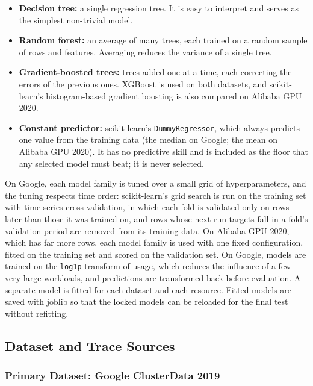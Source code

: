 \documentclass{IEEEtran}
\providecommand{\tightlist}{\setlength{\itemsep}{0pt}\setlength{\parskip}{0pt}}
\begin{document}
\begin{itemize}
\tightlist
\item
  \textbf{Decision tree:} a single regression tree. It is easy to interpret and serves as the simplest non-trivial model.
\item
  \textbf{Random forest:} an average of many trees, each trained on a random sample of rows and features. Averaging reduces the variance of a single tree.
\item
  \textbf{Gradient-boosted trees:} trees added one at a time, each correcting the errors of the previous ones. XGBoost is used on both datasets, and scikit-learn's histogram-based gradient boosting is also compared on Alibaba GPU 2020.
\item
  \textbf{Constant predictor:} scikit-learn's \texttt{DummyRegressor}, which always predicts one value from the training data (the median on Google; the mean on Alibaba GPU 2020). It has no predictive skill and is included as the floor that any selected model must beat; it is never selected.
\end{itemize}

On Google, each model family is tuned over a small grid of hyperparameters, and the tuning respects time order: scikit-learn's grid search is run on the training set with time-series cross-validation, in which each fold is validated only on rows later than those it was trained on, and rows whose next-run targets fall in a fold's validation period are removed from its training data. On Alibaba GPU 2020, which has far more rows, each model family is used with one fixed configuration, fitted on the training set and scored on the validation set. On Google, models are trained on the \texttt{log1p} transform of usage, which reduces the influence of a few very large workloads, and predictions are transformed back before evaluation. A separate model is fitted for each dataset and each resource. Fitted models are saved with joblib so that the locked models can be reloaded for the final test without refitting.

\subsection{Dataset and Trace Sources}\label{sec:3.3}

\subsubsection{Primary Dataset: Google ClusterData 2019}\label{sec:3.3.1}
\end{document}

